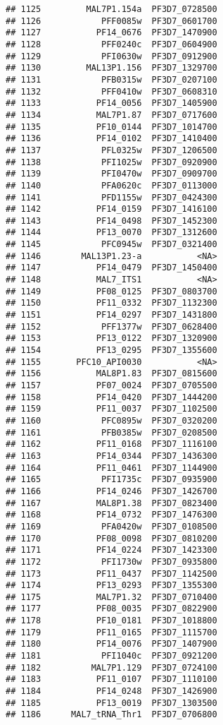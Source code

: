 \documentclass{article}\usepackage[]{graphicx}\usepackage[]{color}
\makeatletter
\newenvironment{kframe}{%
 \def\at@end@of@kframe{}%
 \ifinner\ifhmode%
  \def\at@end@of@kframe{\end{minipage}}%
  \begin{minipage}{\columnwidth}%
 \fi\fi%
 \def\FrameCommand##1{\hskip\@totalleftmargin \hskip-\fboxsep
 \colorbox{shadecolor}{##1}\hskip-\fboxsep
     \hskip-\linewidth \hskip-\@totalleftmargin \hskip\columnwidth}%
 \MakeFramed {\advance\hsize-\width
   \@totalleftmargin\z@ \linewidth\hsize
   \@setminipage}}%
 {\par\unskip\endMakeFramed%
 \at@end@of@kframe}
\newenvironment{knitrout}{}{} %
\makeatother
\begin{document}
\begin{knitrout}
\begin{kframe}
\begin{verbatim}
## 1125         MAL7P1.154a  PF3D7_0728500
## 1126            PFF0085w  PF3D7_0601700
## 1127           PF14_0676  PF3D7_1470900
## 1128            PFF0240c  PF3D7_0604900
## 1129            PFI0630w  PF3D7_0912900
## 1130         MAL13P1.156  PF3D7_1329700
## 1131            PFB0315w  PF3D7_0207100
## 1132            PFF0410w  PF3D7_0608310
## 1133           PF14_0056  PF3D7_1405900
## 1134           MAL7P1.87  PF3D7_0717600
## 1135           PF10_0144  PF3D7_1014700
## 1136           PF14_0102  PF3D7_1410400
## 1137            PFL0325w  PF3D7_1206500
## 1138            PFI1025w  PF3D7_0920900
## 1139            PFI0470w  PF3D7_0909700
## 1140            PFA0620c  PF3D7_0113000
## 1141            PFD1155w  PF3D7_0424300
## 1142           PF14_0159  PF3D7_1416100
## 1143           PF14_0498  PF3D7_1452300
## 1144           PF13_0070  PF3D7_1312600
## 1145            PFC0945w  PF3D7_0321400
## 1146        MAL13P1.23-a           <NA>
## 1147           PF14_0479  PF3D7_1450400
## 1148           MAL7_ITS1           <NA>
## 1149           PF08_0125  PF3D7_0803700
## 1150           PF11_0332  PF3D7_1132300
## 1151           PF14_0297  PF3D7_1431800
## 1152            PFF1377w  PF3D7_0628400
## 1153           PF13_0122  PF3D7_1320900
## 1154           PF13_0295  PF3D7_1355600
## 1155       PFC10_API0030           <NA>
## 1156           MAL8P1.83  PF3D7_0815600
## 1157           PF07_0024  PF3D7_0705500
## 1158           PF14_0420  PF3D7_1444200
## 1159           PF11_0037  PF3D7_1102500
## 1160            PFC0895w  PF3D7_0320200
## 1161            PFB0385w  PF3D7_0208500
## 1162           PF11_0168  PF3D7_1116100
## 1163           PF14_0344  PF3D7_1436300
## 1164           PF11_0461  PF3D7_1144900
## 1165            PFI1735c  PF3D7_0935900
## 1166           PF14_0246  PF3D7_1426700
## 1167           MAL8P1.38  PF3D7_0823400
## 1168           PF14_0732  PF3D7_1476300
## 1169            PFA0420w  PF3D7_0108500
## 1170           PF08_0098  PF3D7_0810200
## 1171           PF14_0224  PF3D7_1423300
## 1172            PFI1730w  PF3D7_0935800
## 1173           PF11_0437  PF3D7_1142500
## 1174           PF13_0293  PF3D7_1355300
## 1175           MAL7P1.32  PF3D7_0710400
## 1177           PF08_0035  PF3D7_0822900
## 1178           PF10_0181  PF3D7_1018800
## 1179           PF11_0165  PF3D7_1115700
## 1180           PF14_0076  PF3D7_1407900
## 1181            PFI1040c  PF3D7_0921200
## 1182          MAL7P1.129  PF3D7_0724100
## 1183           PF11_0107  PF3D7_1110100
## 1184           PF14_0248  PF3D7_1426900
## 1185           PF13_0019  PF3D7_1303500
## 1186      MAL7_tRNA_Thr1  PF3D7_0706800

\end{verbatim}
\end{kframe}
\end{knitrout}
\end{document}

